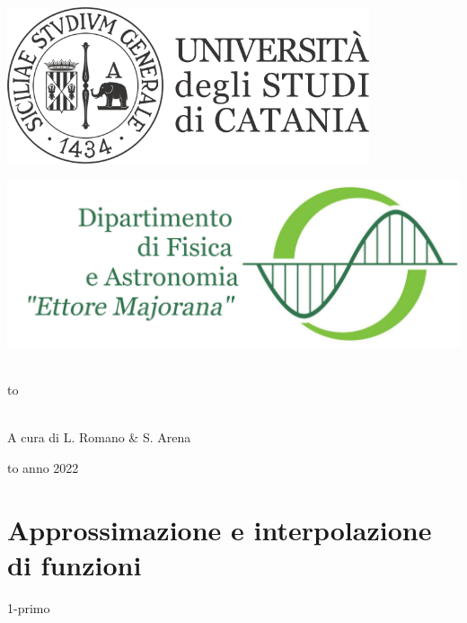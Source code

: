 \documentclass[12pt]{article}
\newcommand\blankpage{%
    \null
    \thispagestyle{empty}%
    \newpage}
\begin{document}
\thispagestyle{empty}
\begin{center}

\begin{minipage}[c]{0.45\textwidth}
\begin{flushleft}
\includegraphics[width=0.8\textwidth]{logo-unict-orizzontale-grigio.png}
\end{flushleft}
\end{minipage}
\hfill
\begin{minipage}[c]{0.45\textwidth}
\begin{flushright}
\includegraphics[width=\textwidth]{logo_dfa_orizzontale}
\end{flushright}
\end{minipage}\\
\medskip
\hbox to \textwidth{\hrulefill}

\vfill
\vfill


\uppercase{}\\

\vfill
\large{A cura di L. Romano \& S. Arena}

\vfill
\vfill
\hbox to \textwidth{\hrulefill}
{\sc anno 2022}
\end{center}

\newpage

\afterpage{\blankpage}

\tableofcontents

\newpage



\section{Approssimazione e interpolazione di funzioni}
{1-primo}
\end{document}
